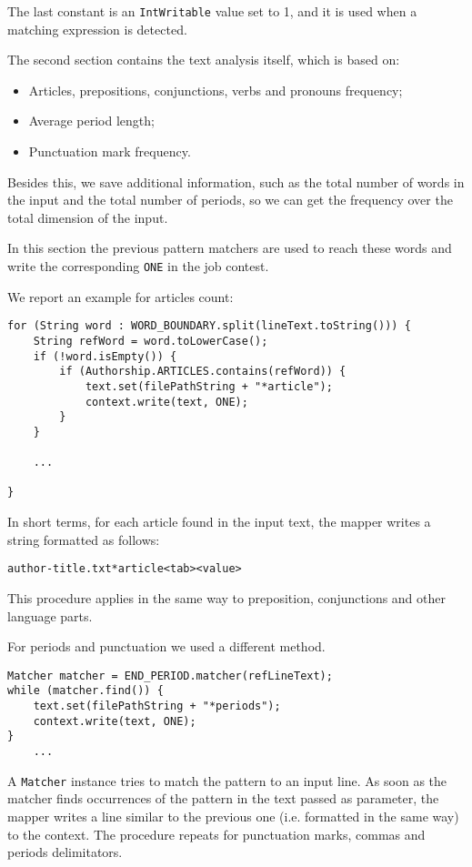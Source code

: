 \documentclass[a4paper,11pt, twoside]{article}
\begin{document}
	\noindent
	The last constant is an \lstinline|IntWritable| value set to 1, and it is used when a matching expression is detected.

	\noindent
	The second section contains the text analysis itself, which is based on: \begin{itemize}
		\item Articles, prepositions, conjunctions, verbs and pronouns frequency;
		\item Average period length;
		\item Punctuation mark frequency.
	\end{itemize}
	Besides this, we save additional information, such as the total number of words in the input and the total number of periods, so we can get the frequency over the total dimension of the input.

	\noindent
	In this section the previous pattern matchers are used to reach these words and write the corresponding \lstinline|ONE| in the job contest. 
	
	\noindent
	We report an example for articles count: \begin{lstlisting}[firstnumber=85, caption={Articles counting in Map method}, captionpos=b]
for (String word : WORD_BOUNDARY.split(lineText.toString())) {
	String refWord = word.toLowerCase();
	if (!word.isEmpty()) {
		if (Authorship.ARTICLES.contains(refWord)) {
			text.set(filePathString + "*article");
			context.write(text, ONE);
		}
	}

	...

}
	\end{lstlisting}
	\noindent
	In short terms, for each article found in the input text, the mapper writes a string formatted as follows:\begin{center}
		\texttt{author-title.txt*article<tab><value>} 
	\end{center}

	This procedure applies in the same way to preposition, conjunctions and other language parts.
	
	\bigskip
	\noindent
	For periods and punctuation we used a different method.
	\begin{lstlisting}[firstnumber=109, caption={Periods counting in Map method}, captionpos=b]
Matcher matcher = END_PERIOD.matcher(refLineText);
while (matcher.find()) {
	text.set(filePathString + "*periods");
	context.write(text, ONE);
}
	...
	\end{lstlisting}
	
	\noindent
	A \lstinline|Matcher| instance tries to match the pattern to an input line. As soon as the matcher finds occurrences of the pattern in the text passed as parameter, the mapper writes a line similar to the previous one (i.e. formatted in the same way) to the context. The procedure repeats for punctuation marks, commas and periods delimitators. 
	
\end{document}
